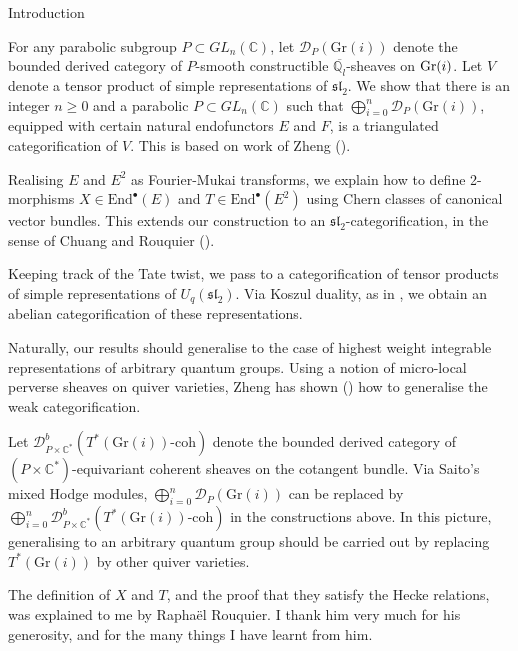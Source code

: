 \documentclass[12pt]{amsart}
\theoremstyle{definition}
\theoremstyle{remark}
\theoremstyle{remark}
\begin{document}
\begin{section}{Introduction}

For any parabolic subgroup $P \subset GL_{n}(\mathbb{C})$, let $\mathcal{D}_{P}(\text{Gr}(i))$ denote the bounded derived category of $P$-smooth constructible $\overline{\mathbb{Q}_{l}}$-sheaves on ${\rm Gr}(i)$. Let $V$ denote a tensor product of simple representations of $\mathfrak{sl}_{2}$. We show that there is an integer $n \geq 0$ and a parabolic $P \subset GL_{n}(\mathbb{C})$ such that $\bigoplus_{i=0}^{n} \mathcal{D}_{P}(\text{Gr}(i))$, equipped with certain natural endofunctors $E$ and $F$, is a triangulated categorification of $V$. This is based on work of Zheng (\cite{ZhengGeometricCategorificationTensorProducts}).

Realising $E$ and $E^{2}$ as Fourier-Mukai transforms, we explain how to define 2-morphisms $X \in \text{End}^{\bullet}(E)$ and $T \in \text{End}^{\bullet}(E^{2})$ using Chern classes of canonical vector bundles. This extends our construction to an $\mathfrak{sl}_{2}$-categorification, in the sense of Chuang and Rouquier (\cite{ChuangRouquierDerivedEquivalencesSymmetricGroupsCategorification}).

Keeping track of the Tate twist, we pass to a categorification of tensor products of simple representations of $U_{q}(\mathfrak{sl}_{2})$. Via Koszul duality, as in \cite{ZhengGeometricCategorificationTensorProducts}, we obtain an abelian categorification of these representations.

Naturally, our results should generalise to the case of highest weight integrable representations of arbitrary quantum groups. Using a notion of micro-local perverse sheaves on quiver varieties, Zheng has shown (\cite{ZhengCategorificationIntegrableRepresentationsQuantumGroups}) how to generalise the weak categorification.

Let $\mathcal{D}^{b}_{P \times \mathbb{C}^{*}}(T^{*}(\text{Gr}(i))\text{-coh})$ denote the bounded derived category of $(P \times \mathbb{C}^{*})$-equivariant coherent sheaves on the cotangent bundle. Via Saito's mixed Hodge modules, $\bigoplus_{i=0}^{n} \mathcal{D}_{P}(\text{Gr}(i))$ can be replaced by $\bigoplus_{i=0}^{n} \mathcal{D}^{b}_{P \times \mathbb{C}^{*}}(T^{*}(\text{Gr}(i))\text{-coh})$ in the constructions above. In this picture, generalising to an arbitrary quantum group should be carried out by replacing $T^{*}(\text{Gr}(i))$ by other quiver varieties.  

The definition of $X$ and $T$, and the proof that they satisfy the Hecke relations, was explained to me by Rapha{\"e}l Rouquier. I thank him very much for his generosity, and for the many things I have learnt from him.   

\
\end{section}
\end{document}
